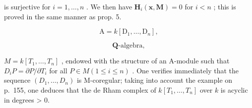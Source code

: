 is surjective for \(i = 1, \ldots, n\) . We then have \(\mathbf{H}_{i}(\mathbf{x}, \mathbf{M}) = 0\) for \(i < n\) ; this is proved in the same manner as prop. 5.

\[
\mathrm{A} = k \left[ \mathrm{D} _ {1}, \dots , \mathrm{D} _ {n} \right],
\]

\[
\mathbf {Q} \text {-algebra},
\]

\(M = k[T_1, \ldots, T_n]\) , endowed with the structure of an A-module such that \(D_i P = \partial P / \partial T_i\) for all \(P \in M (1 \leqslant i \leqslant n)\) . One verifies immediately that the sequence \((D_1, \ldots, D_n)\) is M-coregular; taking into account the example on p.~155, one deduces that the de Rham complex of \(k[T_1, \ldots, T_n]\) over \(k\) is acyclic in degrees \textgreater{} 0.


